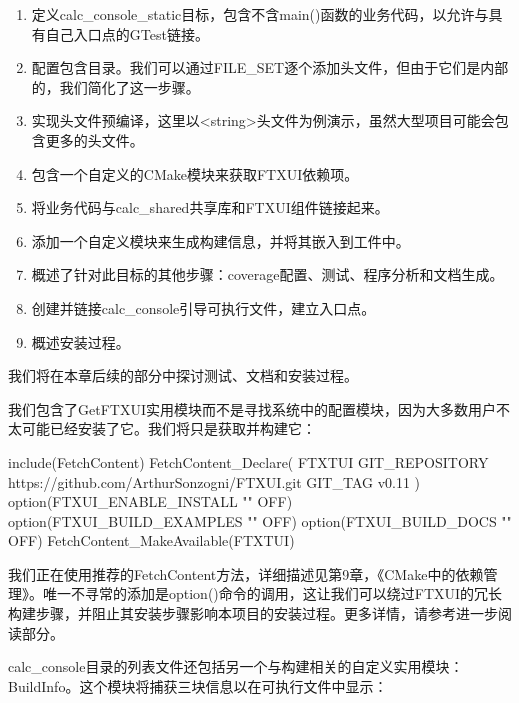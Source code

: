 \begin{enumerate}
\item
定义calc\_console\_static目标，包含不含main()函数的业务代码，以允许与具有自己入口点的GTest链接。

\item
配置包含目录。我们可以通过FILE\_SET逐个添加头文件，但由于它们是内部的，我们简化了这一步骤。

\item
实现头文件预编译，这里以<string>头文件为例演示，虽然大型项目可能会包含更多的头文件。

\item
包含一个自定义的CMake模块来获取FTXUI依赖项。

\item
将业务代码与calc\_shared共享库和FTXUI组件链接起来。

\item
添加一个自定义模块来生成构建信息，并将其嵌入到工件中。

\item
概述了针对此目标的其他步骤：coverage配置、测试、程序分析和文档生成。

\item
创建并链接calc\_console引导可执行文件，建立入口点。

\item
概述安装过程。
\end{enumerate}

我们将在本章后续的部分中探讨测试、文档和安装过程。

我们包含了GetFTXUI实用模块而不是寻找系统中的配置模块，因为大多数用户不太可能已经安装了它。我们将只是获取并构建它：


\begin{cmake}
include(FetchContent)
FetchContent_Declare(
    FTXTUI
    GIT_REPOSITORY https://github.com/ArthurSonzogni/FTXUI.git
    GIT_TAG v0.11
)
option(FTXUI_ENABLE_INSTALL "" OFF)
option(FTXUI_BUILD_EXAMPLES "" OFF)
option(FTXUI_BUILD_DOCS "" OFF)
FetchContent_MakeAvailable(FTXTUI)
\end{cmake}

我们正在使用推荐的FetchContent方法，详细描述见第9章，《CMake中的依赖管理》。唯一不寻常的添加是option()命令的调用，这让我们可以绕过FTXUI的冗长构建步骤，并阻止其安装步骤影响本项目的安装过程。更多详情，请参考进一步阅读部分。

calc\_console目录的列表文件还包括另一个与构建相关的自定义实用模块：BuildInfo。这个模块将捕获三块信息以在可执行文件中显示：

